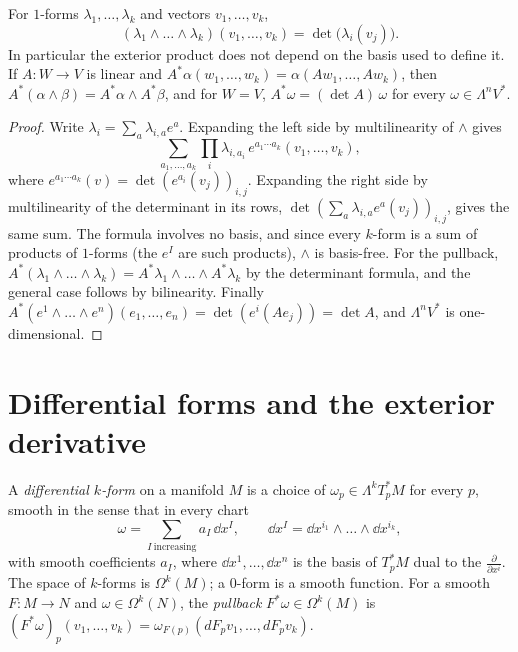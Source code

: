 \begin{proposition}\label{prop:wedgedet}
For $1$-forms $\lambda_1,\dots,\lambda_k$ and vectors $v_1,\dots,v_k$,
\[
(\lambda_1\wedge\dots\wedge\lambda_k)(v_1,\dots,v_k)=\det\bigl(\lambda_i(v_j)\bigr).
\]
In particular the exterior product does not depend on the basis used to define it. If $A\colon W\to V$ is linear and $A^*\alpha(w_1,\dots,w_k)=\alpha(Aw_1,\dots,Aw_k)$,
then $A^*(\alpha\wedge\beta)=A^*\alpha\wedge A^*\beta$, and for $W=V$, $A^*\omega=(\det A)\,\omega$ for every $\omega\in\Lambda^nV^*$.
\end{proposition}
\begin{proof}
Write $\lambda_i=\sum_a\lambda_{i,a}e^a$. Expanding the left side by multilinearity of $\wedge$ gives
\[\sum_{a_1,\dots,a_k}\prod_i\lambda_{i,a_i}\,e^{a_1\cdots a_k}(v_1,\dots,v_k),\]
where $e^{a_1\cdots a_k}(v)=\det(e^{a_i}(v_j))_{i,j}$. Expanding the right side by
multilinearity of the determinant in its rows, $\det(\sum_a\lambda_{i,a}e^a(v_j))_{i,j}$, gives the same sum. The formula involves no basis, and since every
$k$-form is a sum of products of $1$-forms (the $e^I$ are such products), $\wedge$ is basis-free. For the pullback, $A^*(\lambda_1\wedge\dots\wedge\lambda_k)=A^*\lambda_1\wedge\dots\wedge A^*\lambda_k$
by the determinant formula, and the general case follows by bilinearity. Finally $A^*(e^1\wedge\dots\wedge e^n)(e_1,\dots,e_n)=\det(e^i(Ae_j))=\det A$, and $\Lambda^nV^*$ is
one-dimensional.
\end{proof}

\section{Differential forms and the exterior derivative}

\begin{definition}
A \emph{differential $k$-form} on a manifold $M$ is a choice of $\omega_p\in\Lambda^kT_p^*M$ for every $p$, smooth in the sense that in every chart
\[
\omega=\sum_{I\ \mathrm{increasing}}a_I\,\dd x^I,\qquad\dd x^I=\dd x^{i_1}\wedge\dots\wedge\dd x^{i_k},
\]
with smooth coefficients $a_I$, where $\dd x^1,\dots,\dd x^n$ is the basis of $T_p^*M$ dual to the $\frac\partial{\partial x^i}$. The space of $k$-forms is $\Omega^k(M)$; a
$0$-form is a smooth function. For a smooth $F\colon M\to N$ and $\omega\in\Omega^k(N)$, the \emph{pullback} $F^*\omega\in\Omega^k(M)$ is
$(F^*\omega)_p(v_1,\dots,v_k)=\omega_{F(p)}(dF_pv_1,\dots,dF_pv_k)$.
\end{definition}

